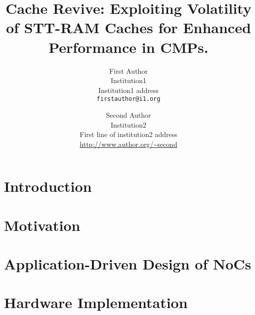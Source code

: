 \documentclass[12pt,letterpaper]{article}
\begin{document}
\title{Cache Revive: Exploiting Volatility of STT-RAM Caches for Enhanced
Performance in CMPs.}

\author{First Author\\
Institution1\\
Institution1 address\\
{\tt\small firstauthor@i1.org}
\and
Second Author\\
Institution2\\
First line of institution2 address\\
{\small\url{http://www.author.org/~second}}
}

\maketitle

\begin{abstract}

\end{abstract}
\section{Introduction} \label{sec:intro}

\section{Motivation} \label{sec:motivation}

\section{Application-Driven Design of NoCs} \label{sec:design}

\section{Hardware Implementation} \label{sec:implementation}

\end{document}
